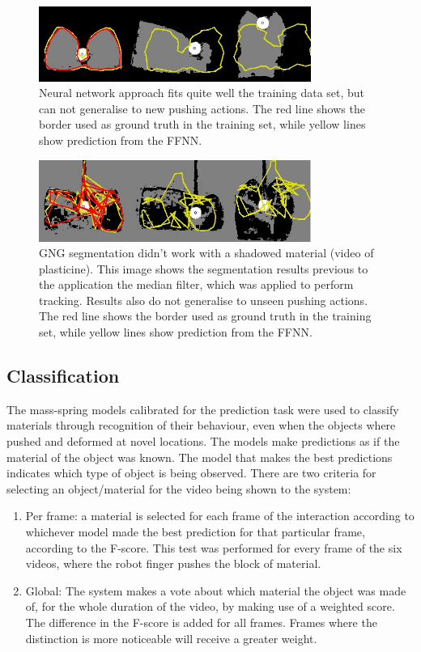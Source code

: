 \documentclass[journal]{IEEEtran}
\begin{document}
\begin{figure}[!t]
\centering
\includegraphics[width=3.5in]{sponge__result.jpg}
\caption{Neural network approach fits quite well the training data set, but can not generalise to new pushing actions.  The red line shows the border used as ground truth in the training set, while yellow lines show prediction from the FFNN.}\label{fig:cretu_prediction_sponge}
\end{figure}
\begin{figure}[!t]
\centering
\includegraphics[width=3.5in]{plasticine__result.jpg}
\caption{GNG segmentation didn't work with a shadowed material (video of plasticine). This image shows the segmentation results previous to the application the median filter, which was applied to perform tracking.  Results also do not generalise to unseen pushing actions.  The red line shows the border used as ground truth in the training set, while yellow lines show prediction from the FFNN.}\label{fig:cretu_prediction_plasticine}
\end{figure}

\subsection{Classification}

The mass-spring models calibrated for the prediction task were used to classify materials through recognition of their behaviour, even when the objects where pushed and deformed at novel locations.  The models make predictions as if the material of the object was known.  The model that makes the best predictions indicates which type of object is being observed.  There are two criteria for selecting an object/material for the video being shown to the system:

\begin{enumerate}
 \item Per frame: a material is selected for each frame of the interaction according to whichever model made the best prediction for that particular frame, according to the F-score. This test was performed for every frame of the six videos, where the robot finger pushes the block of material.

 \item Global: The system makes a vote about which material the object was made of, for the whole duration of the video, by making use of a weighted score. The difference in the F-score is added for all frames.  Frames where the distinction is more noticeable will receive a greater weight.
\end{enumerate}
\end{document}
